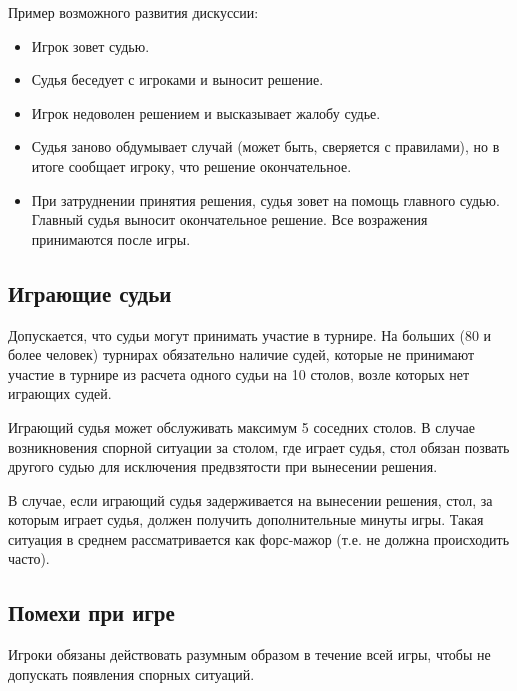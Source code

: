 Пример возможного развития дискуссии:
\begin{itemize}
	\item Игрок зовет судью.
	\item Судья беседует с игроками и выносит решение.
	\item Игрок недоволен решением и высказывает жалобу судье.
	\item Судья заново обдумывает случай (может быть, сверяется с правилами), но в итоге сообщает игроку, что решение окончательное.
	\item При затруднении принятия решения, судья зовет на помощь главного судью. Главный судья выносит окончательное решение. Все возражения принимаются после игры. 
\end{itemize}

\subsection{Играющие судьи}

Допускается, что судьи могут принимать участие в турнире. На больших (80 и более человек) турнирах обязательно наличие судей, которые не принимают участие в турнире из расчета одного судьи на 10 столов, возле которых нет играющих судей.

Играющий судья может обслуживать максимум 5 соседних столов. В случае возникновения спорной ситуации за столом, где играет судья, стол обязан позвать другого судью для исключения предвзятости при вынесении решения. 

В случае, если играющий судья задерживается на вынесении решения, стол, за которым играет судья, должен получить дополнительные минуты игры. Такая ситуация в среднем рассматривается как форс-мажор (т.е. не должна происходить часто).

\subsection{Помехи при игре}

Игроки обязаны действовать разумным образом в течение всей игры, чтобы не допускать появления спорных ситуаций.

